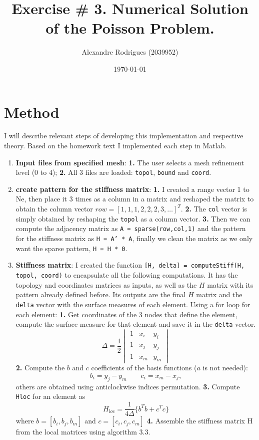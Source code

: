 \documentclass[a4paper, 11pt]{article}
\begin{document}
	
	\title{Exercise \# 3. Numerical Solution of the Poisson Problem. }
	\author{{\small Alexandre Rodrigues (2039952)}}
	\date{\today}
	
	\maketitle
		\section{Method}
			I will describe relevant steps of developing this implementation and respective theory.
			Based on the homework text I implemented each step in Matlab.
			
			\begin{enumerate}
				\item \textbf{Input files from specified mesh}:
					\subitem \textbf{1.} The user selects a mesh refinement level (0 to 4);
					\subitem \textbf{2.} All 3 files are loaded: \texttt{topol}, \texttt{bound} and \texttt{coord}.	
				
				\item \textbf{create pattern for the stiffness matrix}: 
					\subitem \textbf{1.} I created a range vector 1 to Ne, then place it 3 times as a column in a matrix and reshaped the matrix to obtain the column vector $ row = [1,1,1,2,2,2,3,\ldots]^T $. 
					\subitem \textbf{2.} The \texttt{col} vector is simply obtained by reshaping the \texttt{topol} as a column vector. 
					\subitem \textbf{3.} Then we can compute the adjacency matrix as \texttt{A = sparse(row,col,1)} and the pattern for the stiffness matrix as \texttt{H = A' * A}, finally we clean the matrix as we only want the sparse pattern, \texttt{H = H * 0}.
				
				\item \textbf{Stiffness matrix}:
					I created the function \texttt{[H, delta] = computeStiff(H, topol, coord)} to encapsulate all the following computations.
					It has the topology and coordinates matrices as inputs, as well as the $ H $ matrix with its pattern already defined before.
					Its outputs are the final $ H $ matrix and the \texttt{delta} vector with the surface measures of each element.
					Using a for loop for each element:
					\subitem \textbf{1.} Get coordinates of the 3 nodes that define the element, compute the surface measure for that element and save it in the \texttt{delta} vector.
					$$ \Delta = \frac{1}{2} \begin{vmatrix} 1 & x_i & y_i \\ 1 & x_j & y_j \\ 1 & x_m & y_m \end{vmatrix} $$
					\subitem \textbf{2.} Compute the $ b $ and $ c  $ coefficients of the basis functions ($a$ is not needed): 
					$$  b_i = y_j - y_m  \qquad c_i = x_m - x_j ,$$ others are obtained using anticlockwise indices permutation.
					\subitem \textbf{3.} Compute \texttt{Hloc} for an element as 
					$$ H_{loc} = \frac{1}{4\Delta}\{ b^Tb + c^Tc \} $$ 
					where $ b = [b_i, b_j, b_m]$ and $ c = [c_i, c_j, c_m]$
					\subitem \textbf{4.} Assemble the stiffness matrix H from the local matrices using algorithm 3.3.
				

\end{enumerate}
\end{document}
